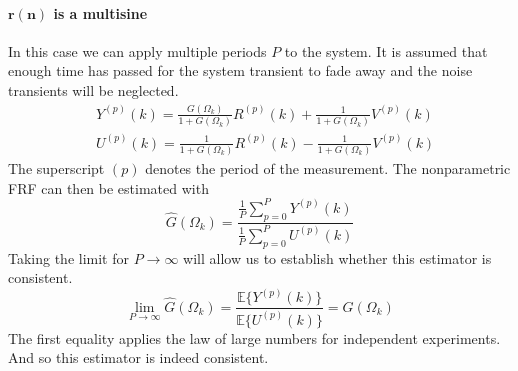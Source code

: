 \paragraph{$\boldsymbol{r(n)}$ is a multisine}
In this case we can apply multiple periods $P$ to the system. It is assumed that enough time has passed for the system transient to fade away and the noise transients will be neglected.
\begin{align*}
    &Y^{(p)}(k) = \frac{G(\Omega_k)}{1+G(\Omega_k)} R^{(p)}(k) + \frac{1}{1+G(\Omega_k)} V^{(p)}(k)\\
    &U^{(p)}(k) = \frac{1}{1+G(\Omega_k)} R^{(p)}(k) - \frac{1}{1+G(\Omega_k)} V^{(p)}(k)
\end{align*}
The superscript $(p)$ denotes the period of the measurement. The nonparametric FRF can then be estimated with
\begin{equation}
    \hat G(\Omega_k) = \frac{ \frac{1}{P}\sum_{p=0}^P Y^{(p)}(k) } { \frac{1}{P}\sum_{p=0}^P U^{(p)}(k) }
    \label{eq:G_estimator_for_MS}
\end{equation}
Taking the limit for $P \rightarrow \infty$ will allow us to establish whether this estimator is consistent.
\begin{equation*}
    \lim_{P\rightarrow\infty} \hat G(\Omega_k) = \frac{ \mathbb{E}\{ Y^{(p)}(k) \}} { \mathbb{E}\{ U^{(p)}(k) \}} = G(\Omega_k)
\end{equation*}
The first equality applies the law of large numbers for independent experiments. And so this estimator is indeed consistent.

